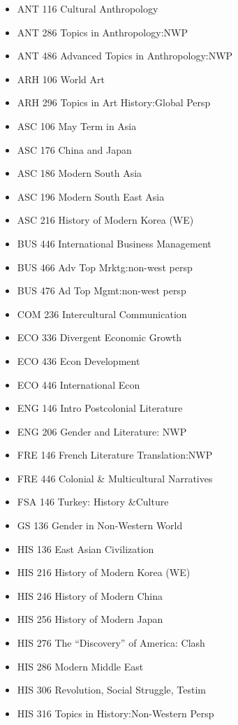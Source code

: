 \documentclass[
  letterpaper,
]{scrbook}
\providecommand{\tightlist}{%
  \setlength{\itemsep}{0pt}\setlength{\parskip}{0pt}}
\begin{document}
\begin{itemize}
\tightlist
\item
  ANT 116 Cultural Anthropology
\item
  ANT 286 Topics in Anthropology:NWP
\item
  ANT 486 Advanced Topics in Anthropology:NWP
\item
  ARH 106 World Art
\item
  ARH 296 Topics in Art History:Global Persp
\item
  ASC 106 May Term in Asia
\item
  ASC 176 China and Japan
\item
  ASC 186 Modern South Asia
\item
  ASC 196 Modern South East Asia
\item
  ASC 216 History of Modern Korea (WE)
\item
  BUS 446 International Business Management
\item
  BUS 466 Adv Top Mrktg:non-west persp
\item
  BUS 476 Ad Top Mgmt:non-west persp
\item
  COM 236 Intercultural Communication
\item
  ECO 336 Divergent Economic Growth
\item
  ECO 436 Econ Development
\item
  ECO 446 International Econ
\item
  ENG 146 Intro Postcolonial Literature
\item
  ENG 206 Gender and Literature: NWP
\item
  FRE 146 French Literature Translation:NWP
\item
  FRE 446 Colonial \& Multicultural Narratives
\item
  FSA 146 Turkey: History \&Culture
\item
  GS 136 Gender in Non-Western World
\item
  HIS 136 East Asian Civilization
\item
  HIS 216 History of Modern Korea (WE)
\item
  HIS 246 History of Modern China
\item
  HIS 256 History of Modern Japan
\item
  HIS 276 The ``Discovery'' of America: Clash
\item
  HIS 286 Modern Middle East
\item
  HIS 306 Revolution, Social Struggle, Testim
\item
  HIS 316 Topics in History:Non-Western Persp

\end{itemize}
\end{document}
